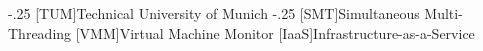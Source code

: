 \documentclass[headsepline,footsepline,footinclude=false,oneside,fontsize=11pt,paper=a4,listof=totoc,bibliography=totoc]{scrbook} %
\begin{document}


\frontmatter{}



%
%

\mainmatter{}

%


\appendix{}


\begin{acronym}
	\itemsep-.25\baselineskip
	[TUM]{Technical University of Munich}
	\itemsep-.25\baselineskip
	[SMT]{Simultaneous Multi-Threading}
	[VMM]{Virtual Machine Monitor}
	[IaaS]{Infrastructure-as-a-Service}
\end{acronym}

\printbibliography{}
\end{document}
